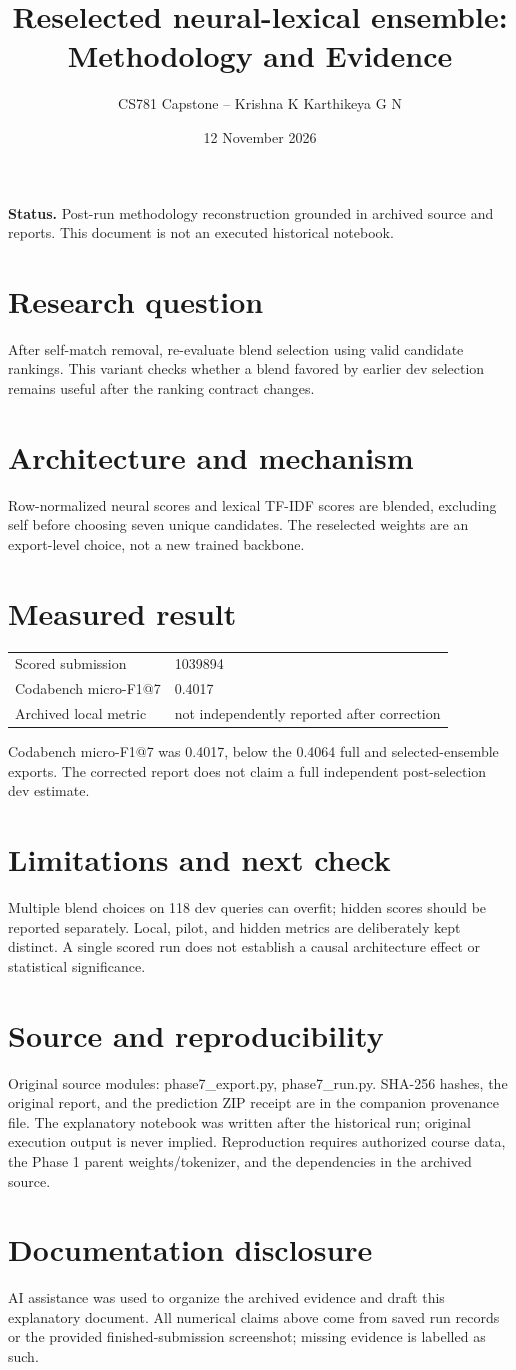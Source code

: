 \documentclass[11pt,a4paper]{article}
\title{Reselected neural-lexical ensemble: Methodology and Evidence}
\author{CS781 Capstone -- Krishna K Karthikeya G N}
\date{12 November 2026}
\begin{document}
\maketitle
\noindent\textbf{Status.} Post-run methodology reconstruction grounded in archived source and reports. This document is not an executed historical notebook.\par
\section*{Research question}
After self-match removal, re-evaluate blend selection using valid candidate rankings. This variant checks whether a blend favored by earlier dev selection remains useful after the ranking contract changes.
\section*{Architecture and mechanism}
Row-normalized neural scores and lexical TF-IDF scores are blended, excluding self before choosing seven unique candidates. The reselected weights are an export-level choice, not a new trained backbone.
\section*{Measured result}
\begin{center}\begin{tabular}{ll}Scored submission & 1039894\\
Codabench micro-F1@7 & 0.4017\\
Archived local metric & not independently reported after correction\end{tabular}\end{center}
Codabench micro-F1@7 was 0.4017, below the 0.4064 full and selected-ensemble exports. The corrected report does not claim a full independent post-selection dev estimate.
\section*{Limitations and next check}
Multiple blend choices on 118 dev queries can overfit; hidden scores should be reported separately. Local, pilot, and hidden metrics are deliberately kept distinct. A single scored run does not establish a causal architecture effect or statistical significance.
\section*{Source and reproducibility}
Original source modules: phase7\_export.py, phase7\_run.py. SHA-256 hashes, the original report, and the prediction ZIP receipt are in the companion provenance file. The explanatory notebook was written after the historical run; original execution output is never implied. Reproduction requires authorized course data, the Phase 1 parent weights/tokenizer, and the dependencies in the archived source.
\section*{Documentation disclosure}
AI assistance was used to organize the archived evidence and draft this explanatory document. All numerical claims above come from saved run records or the provided finished-submission screenshot; missing evidence is labelled as such.
\end{document}

